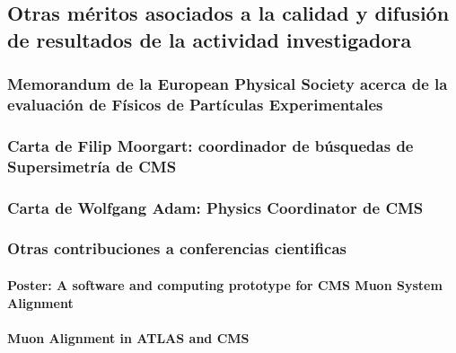 \documentclass[a4paper, 11pt, twoside, openright]{report}
\begin{document}
\subsection{Otras méritos asociados a la calidad y difusión de resultados de la actividad investigadora}

\subsubsection{Memorandum de la European Physical Society acerca de la evaluación de Físicos de Partículas Experimentales}


\subsubsection{Carta de Filip Moorgart: coordinador de búsquedas de Supersimetría de CMS}


\subsubsection{Carta de Wolfgang Adam: Physics Coordinator de CMS}



\subsubsection{Otras contribuciones a conferencias cientificas}


\paragraph{Poster: A software and computing prototype for CMS Muon System Alignment}


\paragraph{Muon Alignment in ATLAS and CMS}

\end{document}
